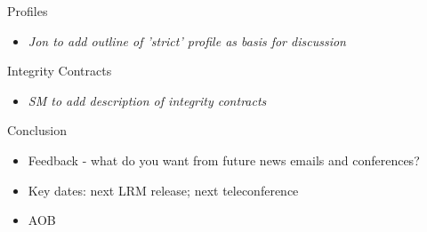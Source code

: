 \documentclass{beamer}
\begin{document}
\begin{frame}{Profiles}

  \begin{itemize}

  \item \emph{Jon to add outline of 'strict' profile as basis for discussion}

  \end{itemize}

\end{frame}

\begin{frame}{Integrity Contracts}

  \begin{itemize}

  \item \emph{SM to add description of integrity contracts}

  \end{itemize}

\end{frame}

\begin{frame}{Conclusion}

  \begin{itemize}

  \item Feedback - what do you want from future news emails and conferences?
  \item Key dates: next LRM release; next teleconference
  \item AOB

  \end{itemize}

\end{frame}
\end{document}
